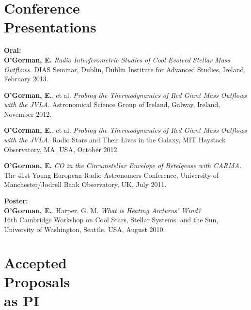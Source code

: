 \documentclass[margin,line]{resume}
\begin{document}
\begin{resume}
    \vspace{4mm}
    \section{\mysidestyle Conference\\Presentations}

    \textbf{Oral:} \vspace{2mm}\\\vspace{1mm}%
\textbf{O'Gorman, E.} \textit{Radio Interferometric Studies of Cool Evolved Stellar Mass Outflows.}
DIAS Seminar, Dublin, Dublin Institute for Advanced Studies, Ireland, February 2013. %
    
	\textbf{O'Gorman, E.}, et al. \textit{Probing the Thermodynamics of Red Giant Mass Outflows with the JVLA.}
Astronomical Science Group of Ireland, Galway, Ireland, November 2012. %
    
\textbf{O'Gorman, E.}, et al. \textit{Probing the Thermodynamics of Red Giant Mass Outflows with the JVLA.}
Radio Stars and Their Lives in the Galaxy, MIT Haystack Observatory, MA, USA, October 2012. %

\textbf{O'Gorman, E.} \textit{CO in the Circumstellar Envelope of Betelgeuse with CARMA.}
The 41st Young European Radio Astronomers Conference, University of Manchester/Jodrell Bank Observatory, UK, July 2011.

    \textbf{Poster:} \vspace{2mm}\\\vspace{1mm}%
    \textbf{O'Gorman, E.}, Harper, G. M. \textit{What is Heating Arcturus' Wind?}\\
16th Cambridge Workshop on Cool Stars, Stellar Systems, and the Sun, University of Washington, Seattle, USA, August 2010.


    \vspace{4mm}
    \section{\mysidestyle Accepted\\Proposals\\as PI}


\end{resume}
\end{document}
